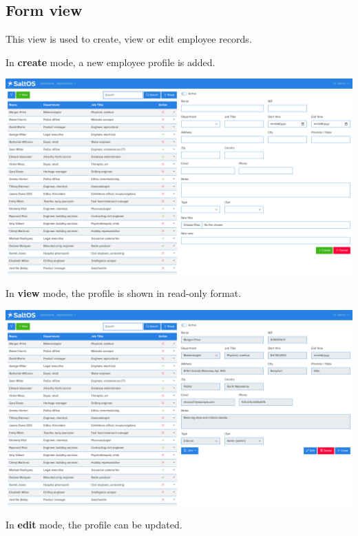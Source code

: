 \documentclass[a4paper]{article}
\begin{document}
\hypertarget{toc109}{}
\subsection{Form view}

This view is used to create, view or edit employee records.

In \textbf{create} mode, a new employee profile is added.

\begin{center}\includegraphics[width=1\textwidth]{../ujest/snaps/test-screenshots-js-screenshots-hr-employees-create-en-us-1-snap.png}\end{center}

In \textbf{view} mode, the profile is shown in read-only format.

\begin{center}\includegraphics[width=1\textwidth]{../ujest/snaps/test-screenshots-js-screenshots-hr-employees-view-100-en-us-1-snap.png}\end{center}

In \textbf{edit} mode, the profile can be updated.
\end{document}

